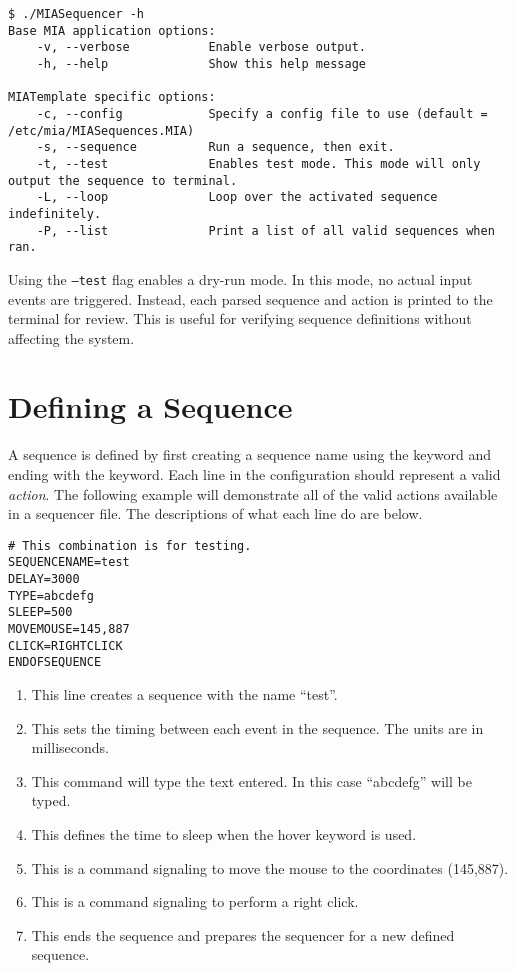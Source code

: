 \begin{lstlisting}[style=terminalstyle]
$ ./MIASequencer -h
Base MIA application options:
	-v, --verbose           Enable verbose output.
	-h, --help              Show this help message

MIATemplate specific options:
	-c, --config            Specify a config file to use (default = /etc/mia/MIASequences.MIA)
	-s, --sequence          Run a sequence, then exit.
	-t, --test              Enables test mode. This mode will only output the sequence to terminal.
	-L, --loop              Loop over the activated sequence indefinitely.
	-P, --list              Print a list of all valid sequences when ran.
\end{lstlisting}

Using the \texttt{--test} flag enables a dry-run mode. In this mode, no actual input events are triggered. Instead, each parsed sequence and action is printed to the terminal for review. This is useful for verifying sequence definitions without affecting the system.


\section{Defining a Sequence}

A sequence is defined by first creating a sequence name using the  keyword and ending with the  keyword. Each line in the configuration should represent a valid \textit{action}. The following example will demonstrate all of the valid actions available in a sequencer file. The descriptions of what each line do are below.

\begin{lstlisting}[style=pythonstyle]
# This combination is for testing.
SEQUENCENAME=test
DELAY=3000
TYPE=abcdefg
SLEEP=500
MOVEMOUSE=145,887
CLICK=RIGHTCLICK
ENDOFSEQUENCE
\end{lstlisting}

\begin{enumerate}
	\item {} This line creates a sequence with the name ``test''.
	\item {} This sets the timing between each event in the sequence. The units are in milliseconds.
	\item {} This command will type the text entered. In this case ``abcdefg'' will be typed.
	\item {} This defines the time to sleep when the hover keyword is used.
	\item {} This is a command signaling to move the mouse to the coordinates (145,887).
	\item {} This is a command signaling to perform a right click.
	\item {} This ends the sequence and prepares the sequencer for a new defined sequence.
\end{enumerate}

